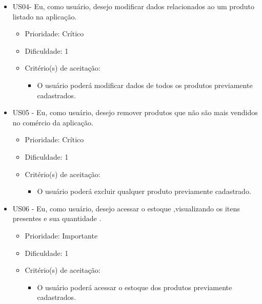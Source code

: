 \begin{itemize}
\item US04- Eu, como usuário, desejo modificar dados relacionados ao um produto listado na aplicação.
    \begin{itemize}
    \item Prioridade: Crítico
    \item Dificuldade: 1
    \item Critério(s) de aceitação:
			\begin{itemize}
				\item O usuário poderá modificar dados de todos os produtos previamente cadastrados.
			\end{itemize}
    \end{itemize}

\item US05 - Eu, como usuário, desejo remover produtos que não são mais vendidos no comércio da aplicação.
    \begin{itemize}
    \item Prioridade: Crítico
    \item Dificuldade: 1
    \item Critério(s) de aceitação:
			\begin{itemize}
				\item O usuário poderá excluir qualquer produto previamente cadastrado.
			\end{itemize}
    \end{itemize}

\item US06 - Eu, como usuário, desejo acessar o estoque ,visualizando os itens presentes e sua quantidade .
    \begin{itemize}
    \item Prioridade: Importante
    \item Dificuldade: 1
    \item Critério(s) de aceitação:
			\begin{itemize}
				\item O usuário poderá acessar o estoque dos produtos previamente cadastrados.
			\end{itemize}
    \end{itemize}


\end{itemize}

